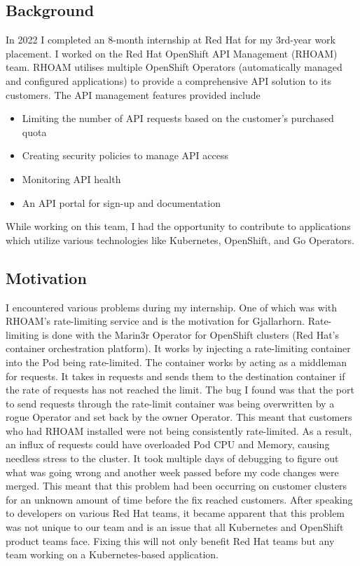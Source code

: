 \documentclass{article}
\begin{document}
\subsection{Background}
In 2022 I completed an 8-month internship at Red Hat for my 3rd-year work placement. I worked on 
the Red Hat OpenShift API Management (RHOAM) team. RHOAM utilises multiple OpenShift Operators 
(automatically managed and configured applications) to provide a comprehensive API solution to its 
customers. The API management features provided include
\begin{itemize}
    \itemsep0em 
    \item Limiting the number of API requests based on the customer’s purchased quota
    \item Creating security policies to manage API access
    \item Monitoring API health
    \item An API portal for sign-up and documentation
\end{itemize}

While working on this team, I had the opportunity to contribute to applications which utilize 
various technologies like Kubernetes, OpenShift, and Go Operators.

\subsection{Motivation}
I encountered various problems during my internship. One of which was with RHOAM’s rate-limiting 
service and is the motivation for Gjallarhorn. Rate-limiting is done with the Marin3r Operator for 
OpenShift clusters (Red Hat’s container orchestration platform). It works by injecting a rate-limiting 
container into the Pod being rate-limited. The container works by acting as a middleman for requests. 
It  takes in requests and sends them to the destination container if the rate of requests has 
not reached the limit. The bug I found was that the port to send requests through the rate-limit 
container was being overwritten by a rogue Operator and set back by the owner Operator. This 
meant that customers who had RHOAM installed were not being consistently rate-limited. As a 
result, an influx of requests could have overloaded Pod CPU and Memory, causing needless stress 
to the cluster. It took multiple days of debugging to figure out what was going wrong and another 
week passed before my code changes were merged. This meant that this problem had been occurring on 
customer clusters for an unknown amount of time before the fix reached customers. After speaking to 
developers on various Red Hat teams, it became apparent that this problem was not unique to our team 
and is an issue that all Kubernetes and OpenShift product teams face. Fixing this will not only 
benefit Red Hat teams but any team working on a Kubernetes-based application.
\end{document}
